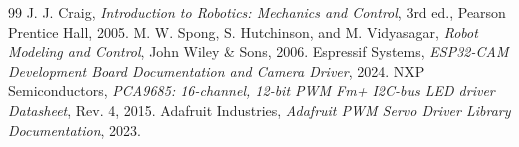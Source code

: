 \documentclass[11pt,a4paper]{article}
\begin{document}
\begin{thebibliography}{99}
 J. J. Craig, \textit{Introduction to Robotics: Mechanics and Control}, 3rd ed., Pearson Prentice Hall, 2005.
 M. W. Spong, S. Hutchinson, and M. Vidyasagar, \textit{Robot Modeling and Control}, John Wiley \& Sons, 2006.
 Espressif Systems, \textit{ESP32-CAM Development Board Documentation and Camera Driver}, 2024.
 NXP Semiconductors, \textit{PCA9685: 16-channel, 12-bit PWM Fm+ I2C-bus LED driver Datasheet}, Rev. 4, 2015.
 Adafruit Industries, \textit{Adafruit PWM Servo Driver Library Documentation}, 2023.
\end{thebibliography}
\end{document}
